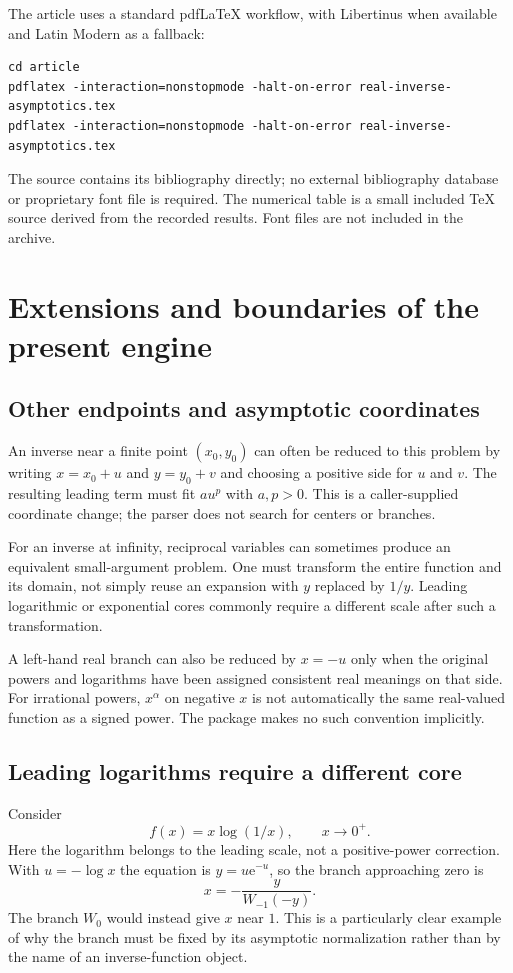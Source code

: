 \documentclass[11pt,a4paper]{article}
\numberwithin{equation}{section}
\theoremstyle{definition}\newtheorem{definition}[theorem]{Definition}
\theoremstyle{remark}\newtheorem{remark}[theorem]{Remark}
\newcommand{\e}{\mathrm e}
\begin{document}
The article uses a standard pdf\LaTeX{} workflow, with Libertinus when
available and Latin Modern as a fallback:
\begin{lstlisting}
cd article
pdflatex -interaction=nonstopmode -halt-on-error real-inverse-asymptotics.tex
pdflatex -interaction=nonstopmode -halt-on-error real-inverse-asymptotics.tex
\end{lstlisting}
The source contains its bibliography directly; no external bibliography
database or proprietary font file is required. The numerical table is a
small included \TeX{} source derived from the recorded results. Font
files are not included in the archive.

\section{Extensions and boundaries of the present engine}
\label{sec:extensions}

\subsection{Other endpoints and asymptotic coordinates}

An inverse near a finite point $(x_0,y_0)$ can often be reduced to this
problem by writing $x=x_0+u$ and $y=y_0+v$ and choosing a positive side for
$u$ and $v$. The resulting leading term must fit $a u^p$ with $a,p>0$.
This is a caller-supplied coordinate change; the parser does not search
for centers or branches.

For an inverse at infinity, reciprocal variables can sometimes produce
an equivalent small-argument problem. One must transform the entire
function and its domain, not simply reuse an expansion with $y$ replaced
by $1/y$. Leading logarithmic or exponential cores commonly require a
different scale after such a transformation.

A left-hand real branch can also be reduced by $x=-u$ only when the
original powers and logarithms have been assigned consistent real
meanings on that side. For irrational powers, $x^\alpha$ on negative
$x$ is not automatically the same real-valued function as a signed power.
The package makes no such convention implicitly.

\subsection{Leading logarithms require a different core}

Consider
\[
 f(x)=x\log(1/x),\qquad x\to0^+.
\]
Here the logarithm belongs to the leading scale, not a positive-power
correction. With $u=-\log x$ the equation is $y=u\e^{-u}$, so the branch
approaching zero is
\begin{equation}
 x=-\frac{y}{W_{-1}(-y)}.
 \label{eq:leading-log-W}
\end{equation}
The branch $W_0$ would instead give $x$ near $1$. This is a particularly
clear example of why the branch must be fixed by its asymptotic
normalization rather than by the name of an inverse-function object.
\end{document}

